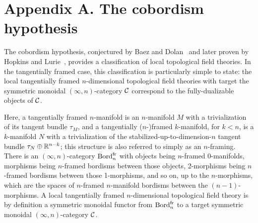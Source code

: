 \documentclass{amsart}
\begin{document}





\renewcommand{\theapptheorem}{A.\arabic{apptheorem}}
\setcounter{apptheorem}{0}


\nopagebreak
{}
\section*{Appendix A. The cobordism hypothesis} \label{app:ch}



The cobordism hypothesis, conjectured by Baez and Dolan~\cite{MR1355899} and later proven by Hopkins and Lurie~\cite{lurie-ch}, provides a classification of local topological field theories.  In the tangentially framed case, this classification is particularly simple to state: the local tangentially framed $n$-dimensional topological field theories with target the symmetric monoidal $(\infty,n)$-category $\mathcal C$ correspond to the fully-dualizable objects of $\mathcal C$.  

Here, a tangentially framed $n$-manifold is an $n$-manifold $M$ with a trivialization of its tangent bundle $\tau_M$, and a tangentially ($n$-)framed $k$-manifold, for $k < n$, is a $k$-manifold $N$ with a trivialization of the stabilized-up-to-dimension-$n$ tangent bundle $\tau_N \oplus \mathbb R^{n-k}$; this structure is also referred to simply as an $n$-framing.  There is an $(\infty,n)$-category $\mathrm{Bord}^\mathrm{fr}_n$ with objects being $n$-framed $0$-manifolds, morphisms being $n$-framed bordisms between those objects, 2-morphisms being $n$-framed bordisms between those 1-morphisms, and so on, up to the $n$-morphisms, which are the spaces of $n$-framed $n$-manifold bordisms between the $(n-1)$-morphisms.  A local tangentially framed $n$-dimensional topological field theory is by definition a symmetric monoidal functor from $\mathrm{Bord}^\mathrm{fr}_n$ to a target symmetric monoidal $(\infty,n)$-category $\mathcal C$.
\end{document}
